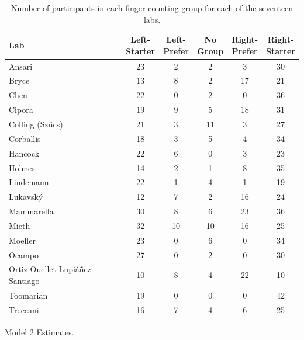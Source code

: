 \documentclass[A4paper,man,floatsintext]{apa6}
\theoremstyle{definition}
\theoremstyle{definition}
\theoremstyle{definition}
\theoremstyle{remark}
\begin{document}
\begin{appendix}
\begin{table}
\caption{\label{tab:count}Number of participants in each finger counting group for each of the seventeen labs.}
\centering
\begin{tabular}[t]{lccccc}
\toprule
Lab & \makecell[c]{Left-\\Starter} & \makecell[c]{Left-\\Prefer} & \makecell[c]{No\\Group} & \makecell[c]{Right-\\Prefer} & \makecell[c]{Right-\\Starter}\\
\midrule
Ansari & 23 & 2 & 2 & 3 & 30\\
Bryce & 13 & 8 & 2 & 17 & 21\\
Chen & 22 & 0 & 2 & 0 & 36\\
Cipora & 19 & 9 & 5 & 18 & 31\\
Colling (Szűcs) & 21 & 3 & 11 & 3 & 27\\
Corballis & 18 & 3 & 5 & 4 & 34\\
Hancock & 22 & 6 & 0 & 3 & 23\\
Holmes & 14 & 2 & 1 & 8 & 35\\
Lindemann & 22 & 1 & 4 & 1 & 19\\
Lukavský & 12 & 7 & 2 & 16 & 24\\
Mammarella & 30 & 8 & 6 & 23 & 36\\
Mieth & 32 & 10 & 10 & 16 & 25\\
Moeller & 23 & 0 & 6 & 0 & 34\\
Ocampo & 27 & 0 & 2 & 0 & 30\\
Ortiz-Ouellet-Lupiáñez-Santiago & 10 & 8 & 4 & 22 & 10\\
Toomarian & 19 & 0 & 0 & 0 & 42\\
Treccani & 16 & 7 & 4 & 6 & 25\\
\bottomrule
\end{tabular}
\end{table}

\begin{table}[!p]
\caption{\label{tab:mod2}Model 2 Estimates.}
\begin{subtable}{\textwidth}
\centering
\begin{table}[H]\centering\begingroup\fontsize{10}{12}\selectfont


\end{table}
\end{subtable}
\end{table}
\end{appendix}
\end{document}

